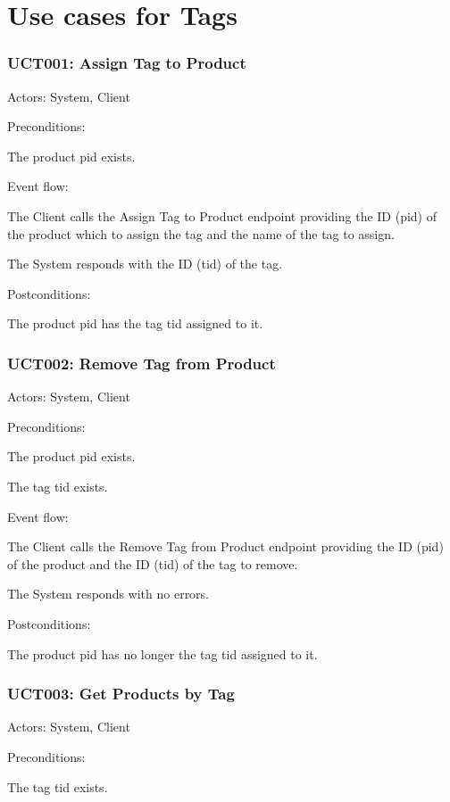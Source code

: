 \section{Use cases for Tags}

\subsubsection{UCT001: Assign Tag to Product}
\label{UCT001}

Actors: System, Client

Preconditions:

\ucitem The product pid exists.

Event flow:

\ucitem The Client calls the Assign Tag to Product endpoint providing the ID (pid) of the product which to assign the tag and the name of the tag to assign.

\ucitem The System responds with the ID (tid) of the tag.

Postconditions:

\ucitem The product pid has the tag tid assigned to it.

\subsubsection{UCT002: Remove Tag from Product}
\label{UCT002}

Actors: System, Client

Preconditions:

\ucitem The product pid exists.

\ucitem The tag tid exists.

Event flow:

\ucitem The Client calls the Remove Tag from Product endpoint providing the ID (pid) of the product and the ID (tid) of the tag to remove.

\ucitem The System responds with no errors.

Postconditions:

The product pid has no longer the tag tid assigned to it.

\subsubsection{UCT003: Get Products by Tag}
\label{UCT003}

Actors: System, Client

Preconditions:

\ucitem The tag tid exists.


